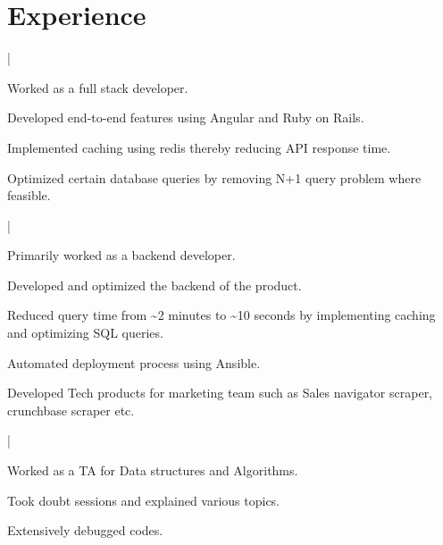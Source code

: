\documentclass[letterpaper]{deedy-resume}
\begin{document}
\begin{minipage}[t]{0.66\textwidth} 

\section{Experience}
 |
\begin{tightitemize}
\sectionspace
\item Worked as a full stack developer.
\item Developed end-to-end features using Angular and Ruby on Rails. \\
\item Implemented caching using redis thereby reducing API response time. \\
\item Optimized certain database queries by removing N+1 query problem where feasible.
\end{tightitemize}
\sectionspace 

 |
\begin{tightitemize}
\item Primarily worked as a backend developer.\\
\item Developed and optimized the backend of the product. \\
\item Reduced query time from \textasciitilde2 minutes to \textasciitilde10 seconds by implementing caching and optimizing SQL queries.
\item Automated deployment process using Ansible. \\
\item Developed Tech products for marketing team such as Sales navigator scraper, crunchbase scraper etc. \\
\end{tightitemize}
\sectionspace 

 |
\begin{tightitemize}
\item Worked as a TA for Data structures and Algorithms.
\item Took doubt sessions and explained various topics. \\
\item Extensively debugged codes. \\
\end{tightitemize}
\sectionspace 



\end{minipage}
\end{document}
